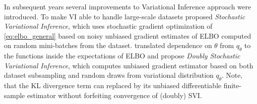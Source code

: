 \documentclass[a4paper,10pt,twocolumn]{article}
\begin{document}
In subsequent years several improvements to Variational Inference approach were introduced.
To make VI able to handle large-scale datasets \citet{hoffman_stochastic_2013} proposed
\emph{Stochastic Variational Inference}, which uses stochastic gradient optimization of
\eqref{eq:elbo_general} based on noisy unbiased gradient estimates of ELBO
computed on random mini-batches from the dataset. \citet{titsias_doubly_2014} translated
dependence on $\theta$ from $q_{\theta}$ to the functions inside the expectations of ELBO
and propose \emph{Doubly Stochastic Variational Inference}, which computes unbiased gradient
estimator based on both dataset subsampling and random draws from variational distribution
$q_{\theta}$. Note, that the KL divergence term can replaced by its unbiased differentiable
finite-sample estimator without forfeiting convergence of (doubly) SVI.
\end{document}
